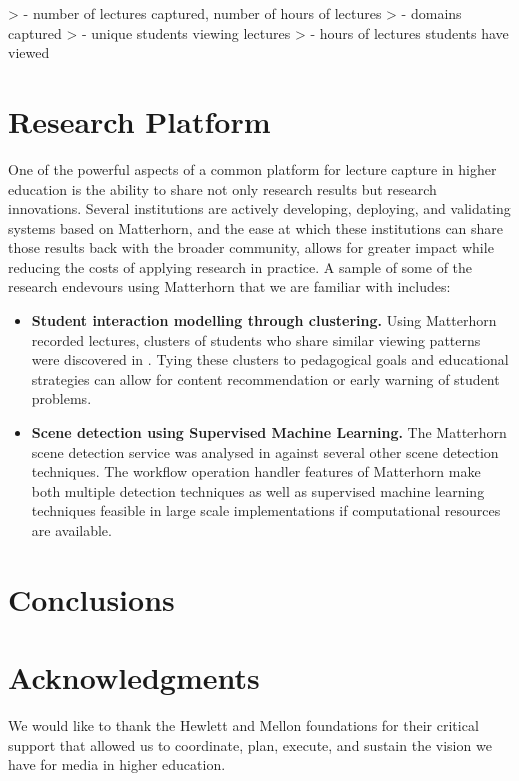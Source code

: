 \documentclass{sig-alternate}
\begin{document}
> - number of lectures captured, number of hours of lectures
> - domains captured
> - unique students viewing lectures
> - hours of lectures students have viewed 

\section{Research Platform}
One of the powerful aspects of a common platform for lecture capture in higher education is the ability to share not only research results but research innovations.  Several institutions are actively developing, deploying, and validating systems based on Matterhorn, and the ease at which these institutions can share those results back with the broader community, allows for greater impact while reducing the costs of applying research in practice.
A sample of some of the research endevours using Matterhorn that we are familiar with includes:
\begin{itemize}
\item \textbf{Student interaction modelling through clustering.}   Using Matterhorn recorded lectures, clusters of students who share similar viewing patterns were discovered in \cite{Brooks2010}.  Tying these clusters to pedagogical goals and educational strategies can allow for content recommendation or early warning of student problems.
\item \textbf{Scene detection using Supervised Machine Learning.}  The Matterhorn scene detection service was analysed in \cite{Johnston2011} against several other scene detection techniques.  The workflow operation handler features of Matterhorn make both multiple detection techniques as well as supervised machine learning techniques feasible in large scale implementations if computational resources are available.
\end{itemize}

\section{Conclusions}


\section{Acknowledgments}
We would like to thank the Hewlett and Mellon foundations for their critical support that allowed us to coordinate, plan, execute, and sustain the vision we have for media in higher education.
\end{document}
